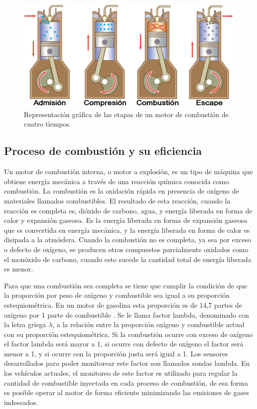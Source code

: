 \begin{figure}
\centering
\includegraphics[width=.9\textwidth]{./Figures/motor-combustion.png}
\caption{Representación gráfica de las etapas de un motor de combustión de cuatro tiempos.}
\label{fig:motor-combustion}
\end{figure}

\subsection{Proceso de combustión y su eficiencia}

Un motor de combustión interna, o motor a explosión, es un tipo de máquina que obtiene energía mecánica a través de una reacción química conocida como combustión. La combustión es la oxidación rápida en presencia de oxígeno de materiales llamados combustibles. El resultado de esta reacción, cuando la reacción es completa es, dióxido de carbono, agua, y energía liberada en forma de calor y expansión gaseosa. Es la energía liberada en forma de expansión gaseosa que es convertida en energía mecánica, y la energía liberada en forma de calor es disipada a la atmósfera. Cuando la combustión no es completa, ya sea por exceso o defecto de oxígeno, se producen otros compuestos parcialmente oxidados como el monóxido de carbono, cuando esto sucede la cantidad total de energía liberada es menor.

Para que una combustión sea completa se tiene que cumplir la condición de que la proporción por peso de oxígeno y combustible sea igual a su proporción estequiométrica. En un motor de gasolina esta proporción es de 14,7 partes de oxígeno por 1 parte de combustible \citep{book-afr}. Se le llama factor lambda, denominado con la letra griega $\lambda$, a la relación entre la proporción oxígeno y combustible actual con su proporción estequiométrica. Si la combustión ocurre con exceso de oxígeno el factor lambda será mayor a 1, si ocurre con defecto de oxígeno el factor será menor a 1, y si ocurre con la proporción justa será igual a 1. Los sensores desarrollados para poder monitorear este factor son llamados sondas lambda. En los vehículos actuales, el monitoreo de este factor es utilizado para regular la cantidad de combustible inyectada en cada proceso de combustión, de esa forma es posible operar al motor de forma eficiente minimizando las emisiones de gases indeseados.

